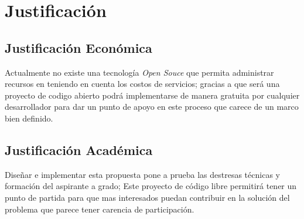 \chapter{Justificación} %

\label{ch:justificacion} %


\section{Justificación Económica}
Actualmente no existe una tecnología \emph{Open Souce} que permita administrar recursos en  teniendo en cuenta los costos de servicios; gracias a que \appName será una proyecto de codigo abierto podrá implementarse de manera gratuita por cualquier desarrollador para dar un punto de apoyo en este proceso que carece de un marco bien definido.\bigskip

\section{Justificación Académica}
Diseñar e implementar esta propuesta pone a prueba las destresas técnicas y formación del aspirante a grado; Este proyecto de código libre permitirá tener un punto de partida para que mas interesados puedan contribuir en la solución del problema que parece tener carencia de participación. 

